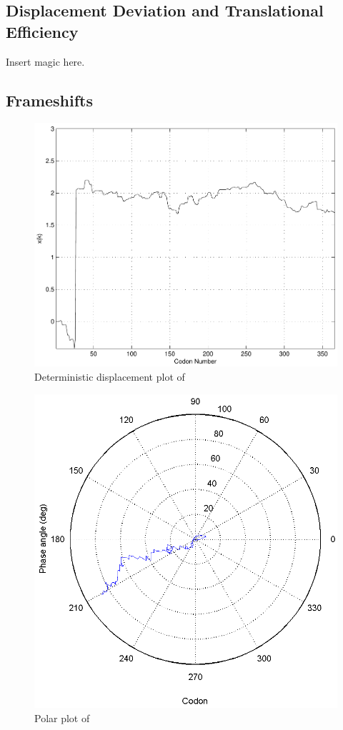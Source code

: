 \documentclass[12pt, draft]{article}
\numberwithin{equation}{section}
\begin{document}
\subsection{Displacement Deviation and Translational Efficiency}
Insert magic here.

\subsection{Frameshifts}
\label{section:frameshifts}

\begin{figure}
  \centering
  \caption{Deterministic displacement plot of~\prfB}
  \label{prfB:deterministic}
  \includegraphics[scale=0.4]{prfB/deterministic}
\end{figure}

\begin{figure}
  \centering
  \caption{Polar plot of \prfB}
  \label{prfB:polar}
  \includegraphics[scale=0.5]{prfB/polar}
\end{figure}
\end{document}
